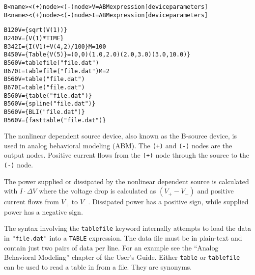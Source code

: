 


\begin{Device}\label{B_DEVICE}

\device
\begin{alltt}
B<name> <(+) node> <(-) node> V={ABM expression} [device parameters]
B<name> <(+) node> <(-) node> I={ABM expression} [device parameters]
\end{alltt}

\examples
\begin{alltt}
B1 2 0 V=\{sqrt(V(1))\}
B2 4 0 V=\{V(1)*TIME\}
B3 4 2 I=\{I(V1) + V(4,2)/100\}  M=100
B4 5 0 V=\{Table \{V(5)\}=(0,0) (1.0,2.0) (2.0,3.0) (3.0,10.0)\}
B5 6 0 V=tablefile("file.dat")
B6 7 0 I=tablefile("file.dat")  M=2
B5 6 0 V=table("file.dat")
B6 7 0 I=table("file.dat")
B5 6 0 V=\{table("file.dat")\}
B5 6 0 V=\{spline("file.dat")\}
B5 6 0 V=\{BLI("file.dat")\}
B5 6 0 V=\{fasttable("file.dat")\}
\end{alltt}

\comments

The nonlinear dependent source device, also known as the B-source
device, is used in analog behavioral modeling (ABM).  The \texttt{(+)}
and \texttt{(-)} nodes are the output nodes. Positive current flows from
the \texttt{(+)} node through the source to the \texttt{(-)}
node. 

The power supplied or dissipated by the nonlinear dependent source is calculated 
with $I \cdot \Delta V$ where the voltage drop is calculated as $(V_+ - V_-)$ 
and positive current flows from $V_+$ to $V_-$.  Dissipated power has a
positive sign, while supplied power has a negative sign.

The syntax involving the \texttt{tablefile} keyword internally attempts to load the
data in \texttt{"file.dat"} into a \texttt{TABLE} expression.  The data file must
be in plain-text and contain just two pairs of data per line.  For an example see 
the ``Analog Behavioral Modeling'' chapter of the \Xyce{} User's
Guide.  
Either \texttt{table} or \texttt{tablefile} can be used to read a table in 
from a file.  They are synonyms.


\end{Device}
